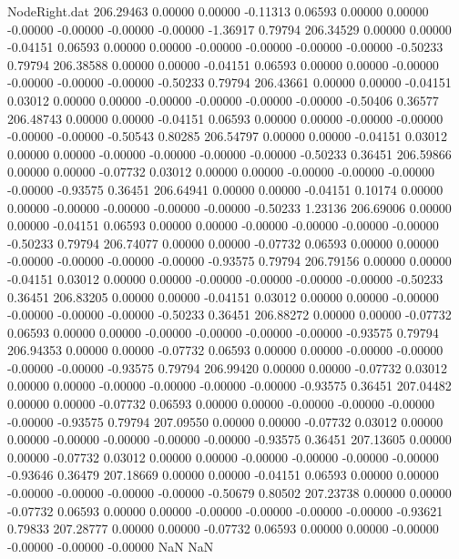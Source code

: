 \begin{filecontents}{NodeRight.dat}
 206.29463    0.00000    0.00000    -0.11313    0.06593    0.00000    0.00000   -0.00000   -0.00000   -0.00000   -0.00000   -1.36917    0.79794
 206.34529    0.00000    0.00000    -0.04151    0.06593    0.00000    0.00000   -0.00000   -0.00000   -0.00000   -0.00000   -0.50233    0.79794
 206.38588    0.00000    0.00000    -0.04151    0.06593    0.00000    0.00000   -0.00000   -0.00000   -0.00000   -0.00000   -0.50233    0.79794
 206.43661    0.00000    0.00000    -0.04151    0.03012    0.00000    0.00000   -0.00000   -0.00000   -0.00000   -0.00000   -0.50406    0.36577
 206.48743    0.00000    0.00000    -0.04151    0.06593    0.00000    0.00000   -0.00000   -0.00000   -0.00000   -0.00000   -0.50543    0.80285
 206.54797    0.00000    0.00000    -0.04151    0.03012    0.00000    0.00000   -0.00000   -0.00000   -0.00000   -0.00000   -0.50233    0.36451
 206.59866    0.00000    0.00000    -0.07732    0.03012    0.00000    0.00000   -0.00000   -0.00000   -0.00000   -0.00000   -0.93575    0.36451
 206.64941    0.00000    0.00000    -0.04151    0.10174    0.00000    0.00000   -0.00000   -0.00000   -0.00000   -0.00000   -0.50233    1.23136
 206.69006    0.00000    0.00000    -0.04151    0.06593    0.00000    0.00000   -0.00000   -0.00000   -0.00000   -0.00000   -0.50233    0.79794
 206.74077    0.00000    0.00000    -0.07732    0.06593    0.00000    0.00000   -0.00000   -0.00000   -0.00000   -0.00000   -0.93575    0.79794
 206.79156    0.00000    0.00000    -0.04151    0.03012    0.00000    0.00000   -0.00000   -0.00000   -0.00000   -0.00000   -0.50233    0.36451
 206.83205    0.00000    0.00000    -0.04151    0.03012    0.00000    0.00000   -0.00000   -0.00000   -0.00000   -0.00000   -0.50233    0.36451
 206.88272    0.00000    0.00000    -0.07732    0.06593    0.00000    0.00000   -0.00000   -0.00000   -0.00000   -0.00000   -0.93575    0.79794
 206.94353    0.00000    0.00000    -0.07732    0.06593    0.00000    0.00000   -0.00000   -0.00000   -0.00000   -0.00000   -0.93575    0.79794
 206.99420    0.00000    0.00000    -0.07732    0.03012    0.00000    0.00000   -0.00000   -0.00000   -0.00000   -0.00000   -0.93575    0.36451
 207.04482    0.00000    0.00000    -0.07732    0.06593    0.00000    0.00000   -0.00000   -0.00000   -0.00000   -0.00000   -0.93575    0.79794
 207.09550    0.00000    0.00000    -0.07732    0.03012    0.00000    0.00000   -0.00000   -0.00000   -0.00000   -0.00000   -0.93575    0.36451
 207.13605    0.00000    0.00000    -0.07732    0.03012    0.00000    0.00000   -0.00000   -0.00000   -0.00000   -0.00000   -0.93646    0.36479
 207.18669    0.00000    0.00000    -0.04151    0.06593    0.00000    0.00000   -0.00000   -0.00000   -0.00000   -0.00000   -0.50679    0.80502
 207.23738    0.00000    0.00000    -0.07732    0.06593    0.00000    0.00000   -0.00000   -0.00000   -0.00000   -0.00000   -0.93621    0.79833
 207.28777    0.00000    0.00000    -0.07732    0.06593    0.00000    0.00000   -0.00000   -0.00000   -0.00000   -0.00000        NaN        NaN
\end{filecontents}
